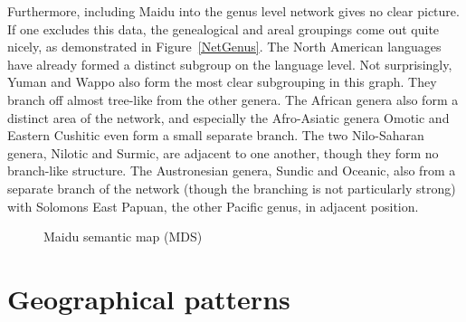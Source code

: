 Furthermore, including Maidu into the genus level network gives no clear picture. 
If one excludes this data, the genealogical and areal groupings come out quite nicely, as demonstrated in Figure~\ref{NetGenus}.
The North American languages have already formed a distinct subgroup on the language level. 
Not surprisingly, Yuman and Wappo also form the most clear subgrouping in this graph. 
They branch off almost tree-like from the other genera. 
The African genera also form a distinct area of the network, and especially the Afro-Asiatic genera Omotic and Eastern Cushitic even form a small separate branch. 
The two Nilo-Saharan genera, Nilotic and Surmic, are adjacent to one another, though they form no branch-like structure. 
The Austronesian genera, Sundic and Oceanic, also from a separate branch of the network (though the branching is not particularly strong) with Solomons East Papuan, the other Pacific genus, in adjacent position.

\begin{figure}[p,h,t,b] \centering {}
\caption{Maidu semantic map (MDS)}\label{maidu}
\end{figure}


\section{Geographical patterns}\label{area}


